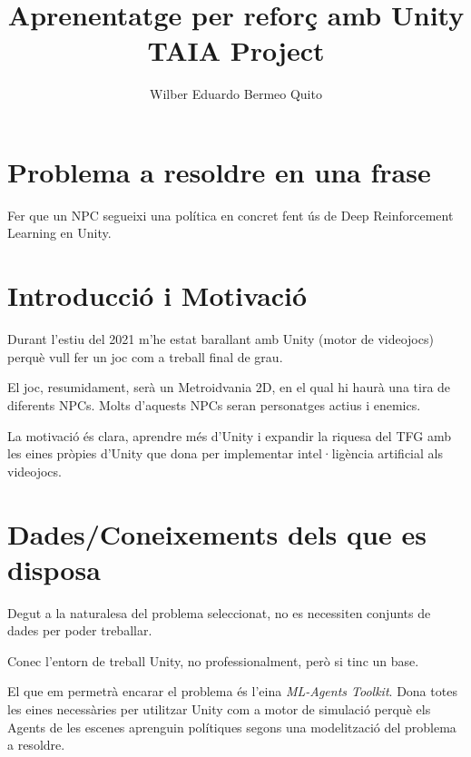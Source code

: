 \documentclass{article}
\title{ \textbf{ Aprenentatge per reforç amb Unity} 
\\ {\Large TAIA Project}}
\author{\small Wilber Eduardo Bermeo Quito }
\begin{document}
\maketitle

    \maketitle
    \thispagestyle{empty}
    \newpage
    
    \tableofcontents
    \newpage
    
    
    \section{Problema a resoldre en una frase}
    
    Fer que un NPC segueixi una política en concret fent ús de Deep Reinforcement Learning en Unity.

    \section{Introducció i Motivació}
    
    Durant l’estiu del 2021 m’he estat barallant amb Unity (motor de videojocs) perquè vull fer un joc com a treball final de grau.
    
    El joc, resumidament, serà un Metroidvania 2D, en el qual hi haurà una tira de diferents NPCs. Molts d’aquests NPCs seran personatges actius i enemics.

    La motivació és clara, aprendre més d'Unity i expandir la riquesa del TFG amb les eines pròpies d’Unity que dona per implementar intel·ligència artificial als videojocs.  
    
    \section{Dades/Coneixements dels que es disposa}
    
    Degut a la naturalesa del problema seleccionat, no es necessiten conjunts de dades per poder treballar.

    Conec l'entorn de treball Unity, no professionalment, però si tinc un base.
    
    El que em permetrà encarar el problema és l'eina \textit{ML-Agents Toolkit}. Dona totes les eines necessàries per utilitzar Unity com a motor de simulació perquè els Agents de les escenes aprenguin polítiques segons una modelització del problema a resoldre.
    
\end{document}
